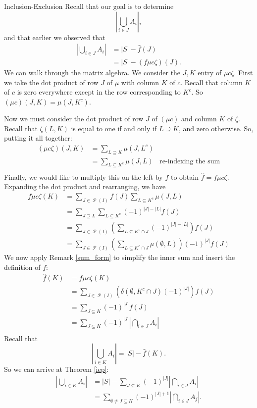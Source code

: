 \documentclass[12pt]{pom_thesis}
\DeclareMathOperator{\ps}{\mathscr{P}}
\begin{document}
\begin{chapter}{Inclusion-Exclusion}
Recall that our goal is to determine 
\[
\left| \bigcup_{i \in J} A_i \right|,
\]
and that earlier we observed that
\begin{align*}
\left| \bigcup_{i \in J} A_i \right| &= |S| - \hat{f}(J)\\
&= |S| - (f\mu c\zeta)(J).
\end{align*}
We can walk through the matrix algebra. We consider the $J,K$ entry of $\mu c \zeta$. First we take the dot product of row $J$ of $\mu$ with column $K$ of $c$. Recall that column $K$ of $c$ is zero everywhere except in the row corresponding to $K^c$. So $(\mu c)(J,K) = \mu(J, K^c)$. 

Now we must consider the dot product of row $J$ of $(\mu c)$ and column $K$ of $\zeta$. Recall that $\zeta(L,K)$ is equal to one if and only if $L \supseteq K$, and zero otherwise. So, putting it all together:
\begin{align*}
(\mu c \zeta)(J,K) &= \sum_{L \supseteq K} \mu(J, L^c)\\
&= \sum_{L \subseteq K^c} \mu(J, L) &\text{re-indexing the sum}\\
\end{align*}
Finally, we would like to multiply this on the left by $f$ to obtain $\hat{f} = f\mu c\zeta$. Expanding the dot product and rearranging, we have
\begin{align*}
f\mu c\zeta(K) &= \sum_{J \in \ps(I)} f(J) \sum_{L \subseteq K^c} \mu(J,L)\\
&= \sum_{J \supseteq L} \sum_{L \subseteq K^c} (-1)^{|J|-|L|} f(J)\\
&= \sum_{J \in \ps(I)}\left( \sum_{L \subseteq K^c \cap J}(-1)^{|J| - |L|} \right) f(J)\\
&= \sum_{J \in \ps(I)}\left( \sum_{L \subseteq K^c \cap J}\mu(\emptyset, L)\right) (-1)^{|J|}f(J)
\end{align*}
We now apply Remark \ref{sum_form} to simplify the inner sum and insert the definition of $f$:
\begin{align*}
\hat{f}(K) &= f\mu c\zeta(K) \\
&=  \sum_{J \in \ps(I)}(\delta(\emptyset, K^c \cap J)(-1)^{|J|} )f(J)\\
&= \sum_{J \subseteq K}(-1)^{|J|}f(J)\\
&= \sum_{J \subseteq K}(-1)^{|J|}\left| \bigcap_{i \in J} A_i\right|\\
\end{align*}
Recall that 
\[
\left| \bigcup_{i \in K} A_i \right| = |S| - \hat{f}(K).
\]
So we can arrive at Theorem \ref{iep}:
\begin{align*}
\left| \bigcup_{i \in K} A_i \right| &= |S| - \sum_{J \subseteq K}(-1)^{|J|}\left| \bigcap_{i \in J} A_i\right|\\
&= \sum_{\emptyset \neq J \subseteq K}(-1)^{|J| + 1}\left|\bigcap_{i \in J}A_j\right|.
\end{align*}

\end{chapter}
\end{document}
